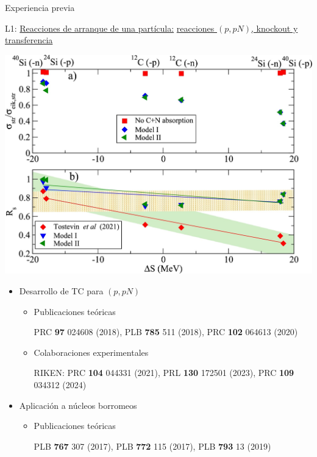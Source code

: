 \documentclass{beamer}
\begin{document}
\begin{frame}{Experiencia previa} 

   \begin{minipage}{0.45\textwidth}
    \tiny L1: \underline{Reacciones de arranque de una partícula:} \underline{reacciones $(p, pN )$, knockout y transferencia}
   
    \includegraphics[height=0.3\textheight]{quenching.jpg}
    \end{minipage}
    \begin{minipage}{0.45\textwidth}
    \tiny
    \begin{itemize}
    \item Desarrollo de TC para $(p,pN)$
    \begin{itemize}
       \tiny
    \item Publicaciones teóricas
    
    PRC \textbf{97} 024608 (2018), PLB \textbf{785} 511 (2018), PRC \textbf{102} 064613 (2020)  
    
    \item Colaboraciones experimentales
    
    RIKEN: PRC \textbf{104} 044331 (2021), PRL \textbf{130} 172501 (2023), PRC \textbf{109} 034312 (2024)    
    
    \end{itemize}
    \item Aplicación a núcleos borromeos
    \begin{itemize}
    \tiny
    \item Publicaciones teóricas
    
    PLB \textbf{767} 307 (2017), PLB \textbf{772} 115 (2017), PLB \textbf{793} 13 (2019)    
    

\end{itemize}
\end{itemize}
\end{minipage}
\end{frame}
\end{document}
